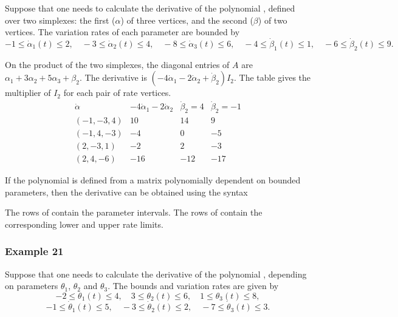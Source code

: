 \documentclass[english,11pt]{article}
\theoremstyle{break} \theorembodyfont{\small\rm}
\begin{document}
Suppose that one needs to calculate the derivative of the polynomial ,
defined over two simplexes: the first ($\alpha$) of three vertices, and the second
($\beta$) of two vertices. The variation rates of each parameter are bounded by
\[
 -1 \leq \dot{\alpha}_1(t) \leq 2, \quad -3 \leq \dot{\alpha}_2(t) \leq 4, \quad
 -8 \leq \dot{\alpha}_3(t) \leq 6, \quad
 -4 \leq \dot{\beta}_1(t) \leq 1, \quad -6 \leq \dot{\beta}_2(t) \leq 9.
\]

On the product of the two simplexes, the diagonal entries of $A$ are
$\alpha_1+3\alpha_2+5\alpha_3+\beta_2$. The derivative is
$(-4\dot\alpha_1-2\dot\alpha_2+\dot\beta_2)I_2$.
The table gives the multiplier of $I_2$ for each pair of rate vertices.
\[
\begin{array}{c|r|rr}
\dot\alpha & -4\dot\alpha_1-2\dot\alpha_2 &
       \dot\beta_2=4 & \dot\beta_2=-1\\ \hline
(-1,-3,4) & 10 & 14 & 9\\
(-1,4,-3) & -4 & 0 & -5\\
(2,-3,1) & -2 & 2 & -3\\
(2,4,-6) & -16 & -12 & -17
\end{array}
\]

If the polynomial is defined from a matrix polynomially dependent on bounded
parameters, then the derivative can be obtained using the syntax

\vspace{0.5cm}%
\noindent\begin{minipage}{\linewidth}
\end{minipage}
\vspace{0.2cm}

The rows of  contain the parameter intervals. The rows of
 contain the corresponding lower and upper rate limits.


\subsubsection*{Example 21}

Suppose that one needs to calculate the derivative of the polynomial ,
depending on  parameters $\theta_1$, $\theta_2$ and $\theta_3$. The bounds and
variation rates are given by
\[
 -2 \leq \theta_1(t) \leq 4, \quad
 3 \leq \theta_2(t) \leq 6, \quad
 1 \leq \theta_3(t) \leq 8,
\]
\[
 -1 \leq \dot{\theta}_1(t) \leq 5, \quad
 -3 \leq \dot{\theta}_2(t) \leq 2, \quad
 -7 \leq \dot{\theta}_3(t) \leq 3.
\]
\end{document}

